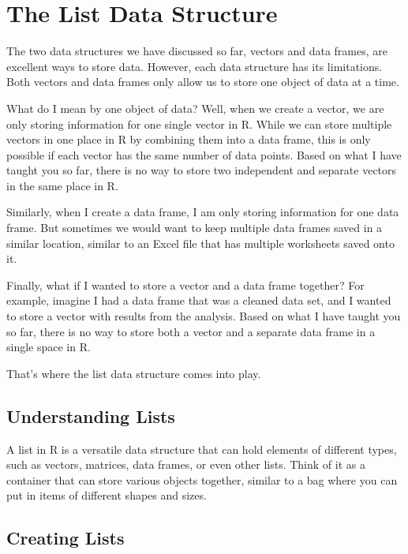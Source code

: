\documentclass[
]{book}
\begin{document}
\hypertarget{the-list-data-structure}{%
\section{The List Data Structure}\label{the-list-data-structure}}

The two data structures we have discussed so far, vectors and data frames, are excellent ways to store data. However, each data structure has its limitations. Both vectors and data frames only allow us to store one object of data at a time.

What do I mean by one object of data? Well, when we create a vector, we are only storing information for one single vector in R. While we can store multiple vectors in one place in R by combining them into a data frame, this is only possible if each vector has the same number of data points. Based on what I have taught you so far, there is no way to store two independent and separate vectors in the same place in R.

Similarly, when I create a data frame, I am only storing information for one data frame. But sometimes we would want to keep multiple data frames saved in a similar location, similar to an Excel file that has multiple worksheets saved onto it.

Finally, what if I wanted to store a vector and a data frame together? For example, imagine I had a data frame that was a cleaned data set, and I wanted to store a vector with results from the analysis. Based on what I have taught you so far, there is no way to store both a vector and a separate data frame in a single space in R.

That's where the list data structure comes into play.

\hypertarget{understanding-lists}{%
\subsection{Understanding Lists}\label{understanding-lists}}

A list in R is a versatile data structure that can hold elements of different types, such as vectors, matrices, data frames, or even other lists. Think of it as a container that can store various objects together, similar to a bag where you can put in items of different shapes and sizes.

\hypertarget{creating-lists}{%
\subsection{Creating Lists}\label{creating-lists}}
\end{document}
